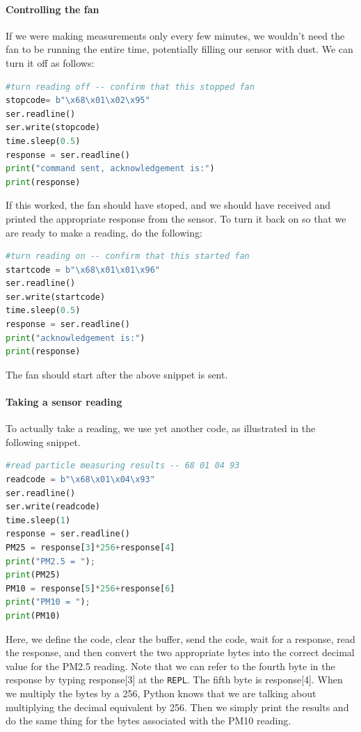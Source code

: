 \paragraph{Controlling the fan}
If we were making measurements only every few minutes, we wouldn’t need the fan to be running the entire time, potentially filling our sensor with dust.  We can turn it off as follows:

\begin{lstlisting}[language=Python]
#turn reading off -- confirm that this stopped fan
stopcode= b"\x68\x01\x02\x95"
ser.readline()
ser.write(stopcode)
time.sleep(0.5)
response = ser.readline()
print("command sent, acknowledgement is:")
print(response)
\end{lstlisting}

If this worked, the fan should have stoped, and we should have received and printed the appropriate response from the sensor.
To turn it back on so that we are ready to make a reading, do the following:

\begin{lstlisting}[language=Python]
#turn reading on -- confirm that this started fan
startcode = b"\x68\x01\x01\x96"
ser.readline()
ser.write(startcode)
time.sleep(0.5)
response = ser.readline()
print("acknowledgement is:")
print(response)

\end{lstlisting}

The fan should start after the above snippet is sent.

\paragraph{Taking a sensor reading}
To actually take a reading, we use yet another code, as illustrated in the following snippet.

\begin{lstlisting}[language=Python]
#read particle measuring results -- 68 01 04 93
readcode = b"\x68\x01\x04\x93"
ser.readline()
ser.write(readcode)
time.sleep(1)
response = ser.readline()
PM25 = response[3]*256+response[4]
print("PM2.5 = ");
print(PM25)
PM10 = response[5]*256+response[6]
print("PM10 = ");
print(PM10)
\end{lstlisting}

Here, we define the code, clear the \uart buffer, send the code, wait for a response, read the response, and then convert the two appropriate bytes into the correct decimal value for the PM2.5 reading.
Note that we can refer to the fourth byte in the response by typing response[3] at the \texttt{REPL}.
The fifth byte is response[4].  When we multiply the bytes by a 256, Python knows that we are talking about multiplying the decimal equivalent by 256.
Then we simply print the results and do the same thing for the bytes associated with the PM10 reading.

